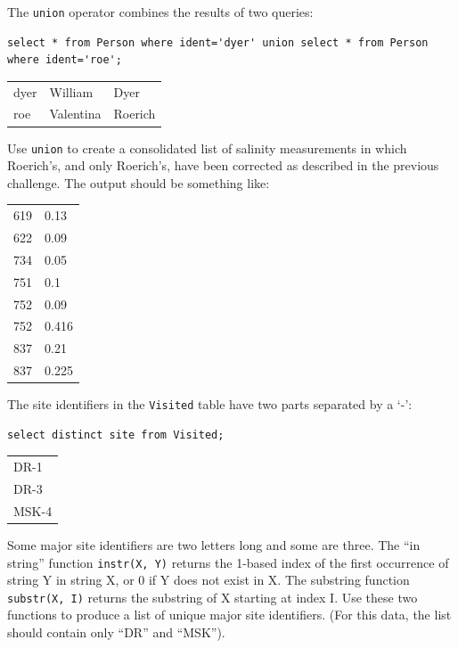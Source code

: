 \documentclass{book}
\begin{document}
\begin{challenge}
  The \texttt{union} operator combines the results of two queries:
\begin{verbatim}
select * from Person where ident='dyer' union select * from Person where ident='roe';
\end{verbatim}

\begin{tabular}{lll}
dyer & William & Dyer \\
roe & Valentina & Roerich \\
\end{tabular}

Use \texttt{union} to create a consolidated list of salinity
measurements in which Roerich's, and only Roerich's, have been corrected
as described in the previous challenge. The output should be something
like:

\begin{tabular}{ll}
619 & 0.13 \\
622 & 0.09 \\
734 & 0.05 \\
751 & 0.1 \\
752 & 0.09 \\
752 & 0.416 \\
837 & 0.21 \\
837 & 0.225 \\
\end{tabular}
\end{challenge}

\begin{challenge}
  The site identifiers in the \texttt{Visited} table have two parts
  separated by a `-':

\begin{verbatim}
select distinct site from Visited;
\end{verbatim}

\begin{tabular}{l}
DR-1 \\
DR-3 \\
MSK-4 \\
\end{tabular}

Some major site identifiers are two letters long and some are three. The
``in string'' function \texttt{instr(X, Y)} returns the 1-based index of
the first occurrence of string Y in string X, or 0 if Y does not exist
in X. The substring function \texttt{substr(X, I)} returns the substring
of X starting at index I. Use these two functions to produce a list of
unique major site identifiers. (For this data, the list should contain
only ``DR'' and ``MSK'').
\end{challenge}
\end{document}
